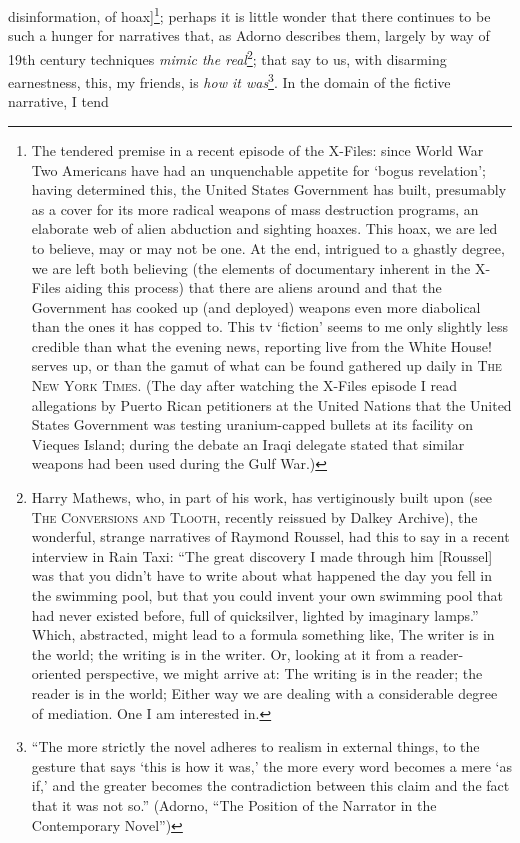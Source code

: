 \documentclass[
]{memoir}
\begin{document}
disinformation, of hoax{]}\footnote{The tendered premise in a recent
  episode of the X-Files: since World War Two Americans have had an
  unquenchable appetite for `bogus revelation'; having determined this,
  the United States Government has built, presumably as a cover for its
  more radical weapons of mass destruction programs, an elaborate web of
  alien abduction and sighting hoaxes. This hoax, we are led to believe,
  may or may not be one. At the end, intrigued to a ghastly degree, we
  are left both believing (the elements of documentary inherent in the
  X-Files aiding this process) that there are aliens around and that the
  Government has cooked up (and deployed) weapons even more diabolical
  than the ones it has copped to. This tv `fiction' seems to me only
  slightly less credible than what the evening news, reporting live from
  the White House! serves up, or than the gamut of what can be found
  gathered up daily in \textsc{The New York Times}. (The day after
  watching the X-Files episode I read allegations by Puerto Rican
  petitioners at the United Nations that the United States Government
  was testing uranium-capped bullets at its facility on Vieques Island;
  during the debate an Iraqi delegate stated that similar weapons had
  been used during the Gulf War.)}; perhaps it is little wonder that
there continues to be such a hunger for narratives that, as Adorno
describes them, largely by way of 19th century techniques \emph{mimic
the real}\footnote{Harry Mathews, who, in part of his work, has
  vertiginously built upon (see \textsc{The Conversions and Tlooth},
  recently reissued by Dalkey Archive), the wonderful, strange
  narratives of Raymond Roussel, had this to say in a recent interview
  in Rain Taxi: ``The great discovery I made through him {[}Roussel{]}
  was that you didn't have to write about what happened the day you fell
  in the swimming pool, but that you could invent your own swimming pool
  that had never existed before, full of quicksilver, lighted by
  imaginary lamps.'' Which, abstracted, might lead to a formula
  something like, The writer is in the world; the writing is in the
  writer. Or, looking at it from a reader-oriented perspective, we might
  arrive at: The writing is in the reader; the reader is in the world;
  Either way we are dealing with a considerable degree of mediation. One
  I am interested in.}; that say to us, with disarming earnestness,
this, my friends, is \emph{how it was}\footnote{``The more strictly the
  novel adheres to realism in external things, to the gesture that says
  `this is how it was,' the more every word becomes a mere `as if,' and
  the greater becomes the contradiction between this claim and the fact
  that it was not so.'' (Adorno, ``The Position of the Narrator in the
  Contemporary Novel'')}. In the domain of the fictive narrative, I tend
\end{document}
